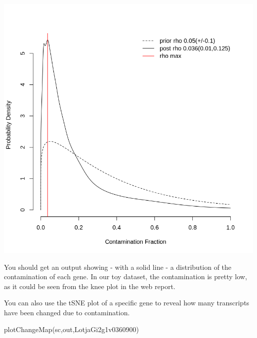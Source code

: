 \documentclass[
  letterpaper,
  DIV=11,
  numbers=noendperiod]{scrartcl}
\newenvironment{Shaded}{\begin{snugshade}}{\end{snugshade}}
\newcommand{\FunctionTok}[1]{\textcolor[rgb]{0.28,0.35,0.67}{#1}}
\newcommand{\NormalTok}[1]{\textcolor[rgb]{0.00,0.23,0.31}{#1}}
\newcommand{\StringTok}[1]{\textcolor[rgb]{0.13,0.47,0.30}{#1}}
\begin{document}
\includegraphics{Cleaningthedata.source_files/figure-pdf/cell-3-output-2.png}

You should get an output showing - with a solid line - a distribution of
the contamination of each gene. In our toy dataset, the contamination is
pretty low, as it could be seen from the knee plot in the web report.

You can also use the tSNE plot of a specific gene to reveal how many
transcripts have been changed due to contamination.

\begin{Shaded}
\begin{Highlighting}[]
\FunctionTok{plotChangeMap}\NormalTok{(sc,out,}\StringTok{\textquotesingle{}LotjaGi2g1v0360900\textquotesingle{}}\NormalTok{)}
\end{Highlighting}
\end{Shaded}
\end{document}
